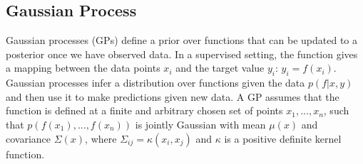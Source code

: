 
\subsection{Gaussian Process}

Gaussian processes (GPs) define a prior over functions that can be updated to a posterior once we have observed data. In a supervised setting, the function gives a mapping between the data points $x_i$ and the target value $y_i$: $y_i = f(x_i)$. Gaussian processes infer a distribution over functions given the data $p(f|x,y)$ and then use it to make predictions given new data. A GP assumes that the function is defined at a finite and arbitrary chosen set of points $x_1,...,x_n$, such that $p(f(x_1),...,f(x_n))$ is jointly Gaussian with mean $\mu(x)$ and covariance $\Sigma(x)$, where $\Sigma_{ij}=\kappa(x_i,x_j)$ and $\kappa$ is a positive definite kernel function.\\

